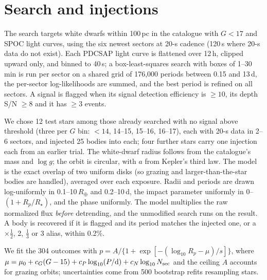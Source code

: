 \documentclass[RNAAS]{aastex631}
\begin{document}
\section{Search and injections}
The search targets white dwarfs within 100\,pc in the \citet{gentilefusillo2021} catalogue with $G<17$ and SPOC light
curves, using the six newest sectors at 20-s cadence (120\,s where 20-s data do not exist). Each PDCSAP light curve is
flattened over 12\,h, clipped upward only, and binned to 40\,s; a box-least-squares search \citep{kovacs2002} with
boxes of 1--30\,min is run per sector on a shared grid of 176,000 periods between 0.15 and 13\,d, the per-sector
log-likelihoods are summed, and the best period is refined on all sectors. A signal is flagged when its signal
detection efficiency is $\geq10$, its depth S/N $\geq8$ and it has $\geq3$ events.

We chose 12 test stars among those already searched with no signal above threshold (three per $G$ bin: $<14$,
14--15, 15--16, 16--17), each with 20-s data in 2--6 sectors, and injected 25 bodies into each; four further stars
carry one injection each from an earlier trial. The white-dwarf radius follows from the catalogue's mass and
$\log g$; the orbit is circular, with $a$ from Kepler's third law. The model is the exact overlap of two uniform disks
(so grazing and larger-than-the-star bodies are handled), averaged over each exposure. Radii and periods are drawn
log-uniformly in 0.1--10\,$R_\oplus$ and 0.2--10\,d, the impact parameter uniformly in $0$--$(1+R_p/R_\star)$, and the
phase uniformly. The model multiplies the raw normalized flux \emph{before} detrending, and the unmodified search runs
on the result. A body is recovered if it is flagged and its period matches the injected one, or a $\times\frac12$,
2, $\frac13$ or 3 alias, within 0.2\%.

We fit the 304 outcomes with $p = A/\{1+\exp[-(\log_{10}R_p-\mu)/s]\}$, where
$\mu=\mu_0+c_G(G-15)+c_P\log_{10}(P/{\rm d})+c_N\log_{10}N_{\rm sec}$ and the ceiling $A$ accounts for grazing
orbits; uncertainties come from 500 bootstrap refits resampling stars.
\end{document}
